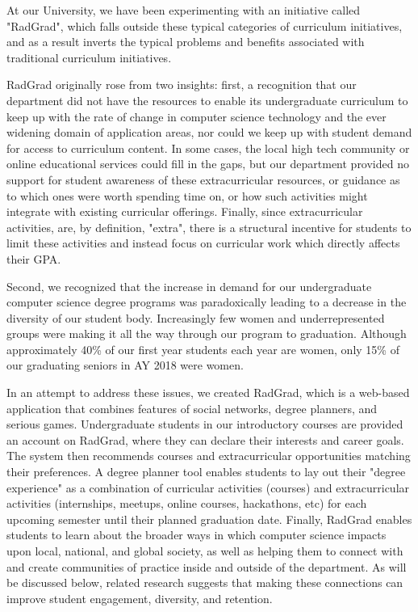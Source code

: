 \documentclass[acmsmall]{acmart}
\begin{document}
At our University, we have been experimenting with an initiative called "RadGrad", which falls outside these typical categories of curriculum initiatives, and as a result inverts the typical problems and benefits associated with traditional curriculum initiatives.

RadGrad originally rose from two insights: first, a recognition that our department did not have the resources to enable its undergraduate curriculum to keep up with the rate of change in computer science technology and the ever widening domain of application areas, nor could we keep up with student demand for access to curriculum content.  In some cases, the local high tech community or online educational services could fill in the gaps, but our department provided no support for student awareness of these extracurricular resources, or guidance as to which ones were worth spending time on, or how such activities might integrate with existing curricular offerings.  Finally, since extracurricular activities, are, by definition, "extra", there is a structural incentive for students to limit these activities and instead focus on curricular work which directly affects their GPA.

Second, we recognized that the increase in demand for our undergraduate computer science degree programs was paradoxically leading to a decrease in the diversity of our student body. Increasingly few women and underrepresented groups were making it all the way through our program to graduation. Although approximately 40\% of our first year students each year are women, only 15\% of our graduating seniors in AY 2018 were women.

In an attempt to address these issues, we created RadGrad, which is a web-based application that combines features of social networks, degree planners, and serious games.  Undergraduate students in our introductory courses are provided an account on RadGrad, where they can declare their interests and career goals. The system then recommends courses and extracurricular opportunities matching their preferences. A degree planner tool enables students to lay out their "degree experience" as a combination of curricular activities (courses) and extracurricular activities (internships, meetups, online courses, hackathons, etc) for each upcoming semester until their planned graduation date. Finally, RadGrad enables students to learn about the broader ways in which computer science impacts upon local, national, and global society, as well as helping them to connect with and create communities of practice inside and outside of the department. As will be discussed below, related research suggests that making these connections can improve student engagement, diversity, and retention.
\end{document}
